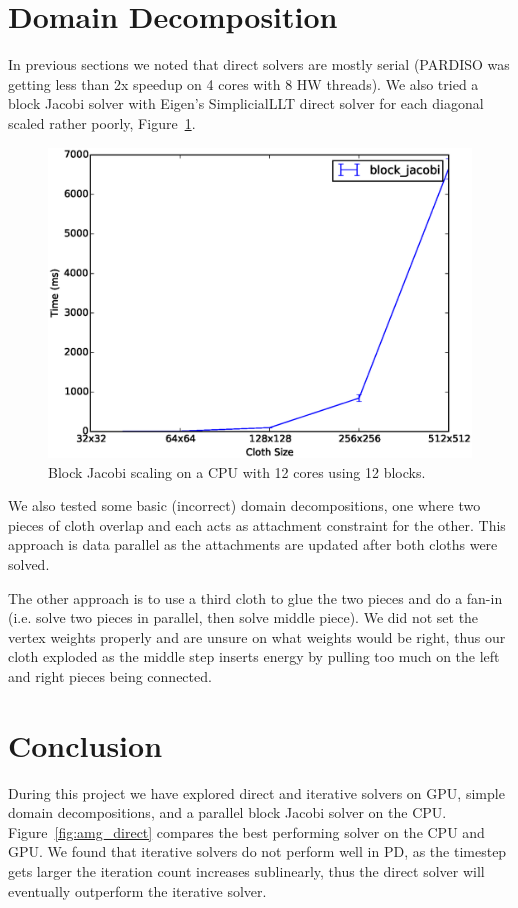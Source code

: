 \documentclass{article}
\begin{document}
\section{Domain Decomposition}
In previous sections we noted that direct solvers are mostly serial (PARDISO
was getting less than 2x speedup on 4 cores with 8 HW threads). We also tried
a block Jacobi solver with Eigen's SimplicialLLT direct solver for each diagonal
scaled rather poorly, Figure~\ref{fig:block_jacobi_scaling}.

\begin{figure}[htb!]
	\centering
	\includegraphics[width=0.9\linewidth]{img/block_jacobi_scaling}
	\caption{Block Jacobi scaling on a CPU with 12 cores using 12 blocks.
	\label{fig:block_jacobi_scaling}}
\end{figure}

We also tested some basic (incorrect) domain decompositions, one where two
pieces of cloth overlap and each acts as attachment constraint for the other.
This approach is data parallel as the attachments are updated after both
cloths were solved.

The other approach is to use a third cloth to glue the two pieces and do a
fan-in (i.e. solve two pieces in parallel, then solve middle piece). We did
not set the vertex weights properly and are unsure on what weights would be right,
thus our cloth exploded as the middle step inserts energy by pulling too much on
the left and right pieces being connected.

\section{Conclusion}
During this project we have explored direct and iterative solvers on GPU,
simple domain decompositions, and a parallel block Jacobi solver on the CPU.
Figure~\ref{fig:amg_direct} compares the best performing solver on the CPU and
GPU. We found that iterative solvers do not perform well in PD, as the
timestep gets larger the iteration count increases sublinearly, thus the
direct solver will eventually outperform the iterative solver.
\end{document}
